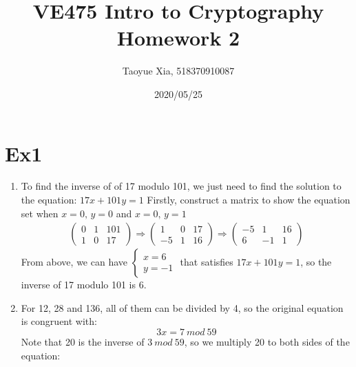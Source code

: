 \documentclass[12pt, a4paper]{article}
\begin{document}
\title{VE475 Intro to Cryptography Homework 2}
\author{Taoyue Xia, 518370910087}
\date{2020/05/25}
\maketitle

\section{Ex1}
\begin{enumerate}
    \item To find the inverse of of 17 modulo 101, we just need to find the solution to the equation: 
          $17x + 101y = 1$\newline
          Firstly, construct a matrix to show the equation set when $x = 0,\, y = 0$ and $x = 0,\, y = 1$\newline
          \begin{equation*}
            \begin{split}
                \begin{pmatrix}
                    0 & 1 & 101\\
                    1 & 0 & 17
                \end{pmatrix}
                \Rightarrow
                \begin{pmatrix}
                    1 & 0 & 17\\
                    -5 & 1 & 16
                \end{pmatrix}
                \Rightarrow
                \begin{pmatrix}
                    -5 & 1 & 16\\
                    6 & -1 & 1
                \end{pmatrix}
            \end{split}
          \end{equation*}
          From above, we can have 
          $\begin{cases}
              x = 6\\
              y = -1
          \end{cases}$ that satisfies $17x + 101y = 1$, so the inverse of 17 modulo 101 is 6.
    \item For 12, 28 and 136, all of them can be divided by 4, so the original equation is congruent with:
          $$3x = 7\ mod\ 59$$\newline
          Note that 20 is the inverse of $3\ mod\ 59$, so we multiply 20 to both sides of the equation:

\end{enumerate}
\end{document}
